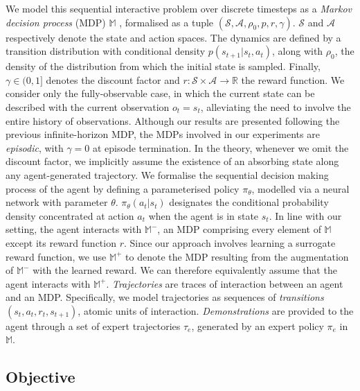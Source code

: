 We model this sequential interactive problem over discrete timesteps as a
\textit{Markov decision process} (MDP) $\mathbb{M}$ \cite{Puterman1994-pf},
formalised as a tuple
$(\mathcal{S}, \mathcal{A}, \rho_0, p, r, \gamma)$.
$\mathcal{S}$ and $\mathcal{A}$ respectively denote the state and action
spaces.
The dynamics are defined by a transition distribution with conditional
density $p(s_{t+1} | s_t, a_t)$, along with $\rho_0$, the density
of the distribution from which the initial state is sampled.
Finally, $\gamma \in (0, 1]$ denotes the discount factor and
$r: \mathcal{S} \times \mathcal{A} \rightarrow \mathbb{R}$ the reward function.
We consider only the fully-observable case, in which the current state can be
described with the current observation $o_t = s_t$, alleviating the need to
involve the entire history of observations.
Although our results are presented following the previous infinite-horizon MDP,
the MDPs involved in our experiments are \textit{episodic},
with $\gamma = 0$ at episode termination.
In the theory, whenever we omit the discount factor, we implicitly assume the
existence of an absorbing state along any agent-generated trajectory.
We formalise the sequential decision making process of the agent by defining a
parameterised policy $\pi_\theta$, modelled via a neural network with parameter
$\theta$.
$\pi_\theta(a_t|s_t)$ designates the conditional probability density
concentrated at action $a_t$ when the agent is in state $s_t$.
In line with our setting, the agent interacts with $\mathbb{M}^-$,
an MDP comprising every element of $\mathbb{M}$ except its reward function $r$.
Since our approach involves learning a surrogate reward function, we use
$\mathbb{M}^+$ to denote the MDP resulting from the augmentation of
$\mathbb{M}^-$ with the learned reward.
We can therefore equivalently assume that the agent interacts with
$\mathbb{M}^+$.
\textit{Trajectories} are traces of interaction between an agent and an MDP.
Specifically, we model trajectories as sequences of \textit{transitions}
$(s_t, a_t, r_t, s_{t+1})$, atomic units of interaction.
\textit{Demonstrations} are provided to the agent through a set of expert
trajectories $\tau_e$, generated by an expert policy $\pi_e$ in $\mathbb{M}$.

\subsection*{Objective}

